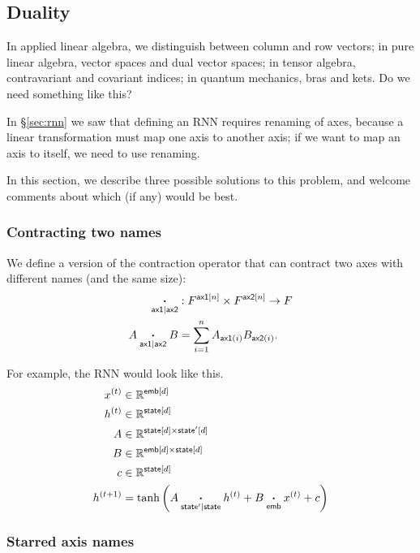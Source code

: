 \subsection{Duality}
\label{sec:duality}

In applied linear algebra, we distinguish between column and row vectors; in pure linear algebra, vector spaces and dual vector spaces; in tensor algebra, contravariant and covariant indices; in quantum mechanics, bras and kets. Do we need something like this?

In \S\ref{sec:rnn} we saw that defining an RNN requires renaming of axes, because a linear transformation must map one axis to another axis; if we want to map an axis to itself, we need to use renaming.

In this section, we describe three possible solutions to this problem, and welcome comments about which (if any) would be best.

\subsubsection{Contracting two names}

We define a version of the contraction operator that can contract two axes with different names (and the same size):
\begin{align*}
\mathbin{\mathop{\boldsymbol\cdot}\limits_{\mathsf{ax1}|\mathsf{ax2}}} &: F^{\mathsf{ax1}[n]} \times F^{\mathsf{ax2}[n]} \rightarrow F \\
A \mathbin{\mathop{\boldsymbol\cdot}\limits_{\mathsf{ax1}|\mathsf{ax2}}} B &= \sum_{i=1}^n A_{\mathsf{ax1}(i)} B_{\mathsf{ax2}(i)}.
\end{align*}

For example, the RNN would look like this.
\begin{align*}
x^{(t)} &\in \mathbb{R}^{\mathsf{emb}[d]} \\
h^{(t)} &\in \mathbb{R}^{\mathsf{state}[d]} \\
A &\in \mathbb{R}^{\mathsf{state}[d] \times \mathsf{state'}[d]} \\
B &\in \mathbb{R}^{\mathsf{emb}[d] \times \mathsf{state}[d]} \\
c &\in \mathbb{R}^{\mathsf{state}[d]} \\
h^{(t+1)} &= \tanh\left( A \mathbin{\mathop{\boldsymbol\cdot}\limits_{\mathsf{state'}|\mathsf{state}}} h^{(t)} + B \mathbin{\mathop{\boldsymbol\cdot}\limits_{\mathsf{emb}}} x^{(t)} + c \right)
\end{align*}

\subsubsection{Starred axis names}

